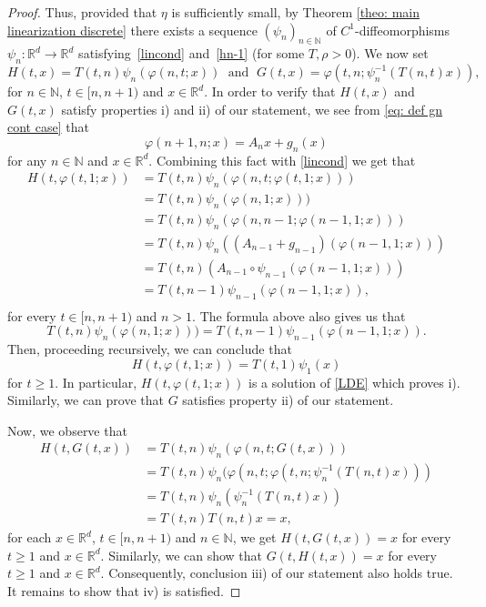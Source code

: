 \documentclass[reqno, a4paper, 10pt]{amsart}
\theoremstyle{plain}
\numberwithin{equation}{section}
\theoremstyle{remark}
\renewcommand{\phi}{\varphi}
\def\N{\mathbb{N}}
\def\R{\mathbb{R}}
\begin{document}
\begin{proof}
Thus, provided that $\eta$ is sufficiently small, by Theorem \ref{theo: main linearization discrete} there exists  a sequence $(\psi_n)_{n\in \N}$ of $C^1$-diffeomorphisms $\psi_n \colon \R^d \to \R^d$ satisfying~\eqref{lincond} and~\eqref{hn-1} (for some $T, \rho >0$).
We now set 
\begin{equation}\label{eq: def of H and G}
    H(t,x)=T(t,n) \psi_n (\phi(n, t;x)) \; \text{ and }\;  G(t,x)=\phi(t, n; \psi_n^{-1}(T(n,t)x)),
\end{equation}
for $n\in \N$, $t\in [n, n+1)$ and $x\in \R^d$. In order to verify that $H(t,x)$ and $G(t,x)$ satisfy properties i) and ii) of our statement, we see from \eqref{eq: def gn cont case} that 
\[
\varphi(n+1,n;x)=A_nx+g_n(x)
\]
for any $n\in \N$ and $x\in \R^d$.
Combining this fact with \eqref{lincond} we get that
\[ 
\begin{split}
H(t,\varphi(t,1;x))&=T(t,n) \psi_n (\phi(n, t;\varphi(t,1;x)))\\
&=T(t,n) \psi_n (\phi(n, 1;x)))\\
&=T(t,n) \psi_n (\phi(n,n-1; \varphi(n-1,1;x)))\\
&=T(t,n) \psi_n ((A_{n-1}+g_{n-1})(\varphi(n-1,1;x)))\\
&=T(t,n) (A_{n-1} \circ \psi_{n-1} (\varphi(n-1,1;x)))\\
&=T(t,n-1) \psi_{n-1} (\varphi(n-1,1;x)),\\
\end{split}
\]
for every $t\in[n,n+1)$ and  $n>1$. The formula above also gives us that 
\[
T(t,n) \psi_n (\phi(n, 1;x)))=
T(t,n-1) \psi_{n-1} (\varphi(n-1,1;x)).
\]
Then, proceeding recursively, we can conclude that 
\[
H(t,\varphi(t,1;x))=T(t,1) \psi_{1} (x) 
\]
for $t\geq 1$. In particular, $H(t,\varphi(t,1;x))$ is a solution of \eqref{LDE} which proves i). Similarly, we can prove that $G$ satisfies property ii) of our statement. 

Now, we observe that
\[
\begin{split}
H(t, G(t, x)) &=T(t, n)\psi_n(\phi(n, t; G(t,x))) \\
&=T(t,n)\psi_n (\phi(n, t; \phi(t, n;\psi_n^{-1}(T(n, t)x)) ) \\
&=T(t,n)\psi_n (\psi_n^{-1}(T(n,t)x)) \\
&=T(t,n)T(n, t)x =x,
\end{split}
\]
for each $x\in \R^d$, $t\in [n, n+1)$ and $n\in \N$, we get $H(t, G(t, x))=x$ for every $t\geq 1$ and $x\in \R^d$. Similarly, we can show that $G(t, H(t, x))=x$ for every $t\geq 1$ and $x\in \R^d$. Consequently, conclusion iii) of our statement also holds true. It remains to show that iv) is satisfied. 


\end{proof}
\end{document}

